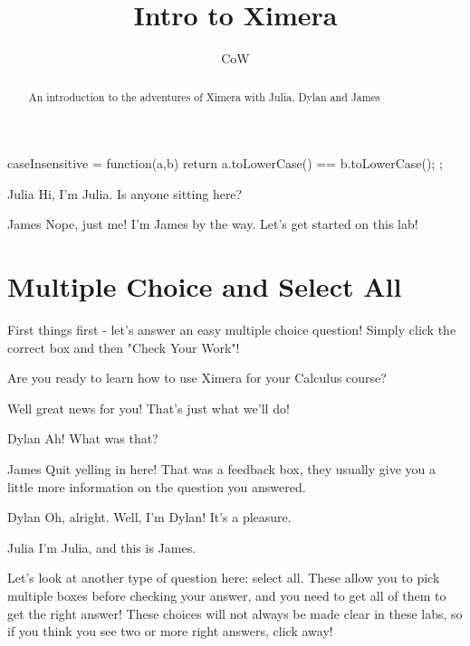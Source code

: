 \documentclass{ximera}
\title{Intro to Ximera}
\author{CoW}
\begin{document}
\maketitle
\begin{abstract}
An introduction to the adventures of Ximera with Julia, Dylan and James
\end{abstract}
\begin{javascript}
 caseInsensitive = function(a,b) {
    return a.toLowerCase() == b.toLowerCase();
  };
\end{javascript}

\begin{dialogue}
\item[Julia] Hi, I'm Julia. Is anyone sitting here?
\item[James] Nope, just me! I'm James by the way. Let's get started on this lab!
\end{dialogue}

\section{Multiple Choice and Select All}
First things first - let's answer an easy multiple choice question! Simply click the correct box and then "Check Your Work"!

\begin{question}
Are you ready to learn how to use Ximera for your Calculus course?

\begin{multipleChoice}
\end{multipleChoice}
\begin{feedback}[correct]
Well great news for you! That's just what we'll do!
\end{feedback}

\end{question}
\begin{dialogue}
\item[Dylan] Ah! What was that?
\item[James] Quit yelling in here! That was a feedback box, they usually give you a little more information on the question you answered.
\item[Dylan] Oh, alright. Well, I'm Dylan! It's a pleasure.
\item[Julia] I'm Julia, and this is James.
\end{dialogue}

Let's look at another type of question here: select all. These allow you to pick multiple boxes before checking your answer, and you need to get all of them to get the right answer! These choices will not always be made clear in these labs, so if you think you see two or more right answers, click away!
\end{document}
